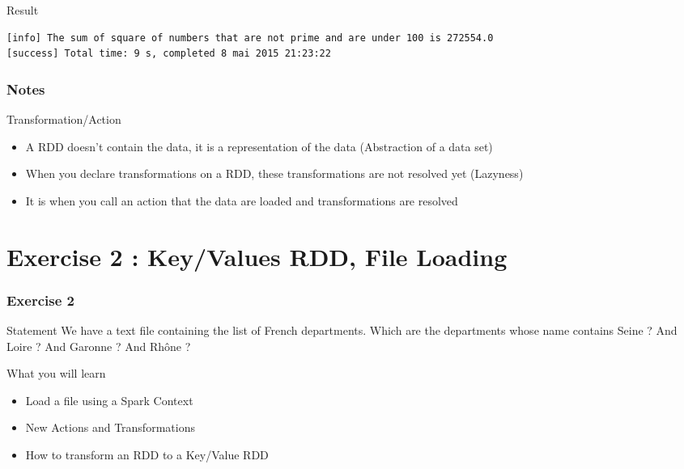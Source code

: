 \documentclass[slidetop,9pt,utf8]{beamer}
\begin{document}
\begin{CJK}{UTF8}{gbsn}
\begin{frame}[fragile]
  \begin{block}{Result}
    \begin{lstlisting}[language=bash, style=terminal]
[info] The sum of square of numbers that are not prime and are under 100 is 272554.0
[success] Total time: 9 s, completed 8 mai 2015 21:23:22
    \end{lstlisting}
  \end{block}

\end{frame}

\begin{frame}
  \frametitle{Notes}

  \begin{exampleblock}{Transformation/Action}
    \begin{itemize}
      \item A RDD doesn't contain the data, it is a representation of the data (Abstraction of a data set)
      \item When you declare transformations on a RDD, these transformations are not resolved yet (Lazyness)
      \item It is when you call an action that the data are loaded and transformations are resolved
    \end{itemize}
  \end{exampleblock}

\end{frame}

%
%
%
%

\section{Exercise 2 : Key/Values RDD, File Loading}


\begin{frame}
  \frametitle{Exercise 2}

  \begin{block}{Statement}
    We have a text file containing the list of French departments. Which are the departments whose name contains Seine ? And Loire ? And Garonne ? And Rhône ?
  \end{block}

  \begin{block}{What you will learn}
    \begin{itemize}
      \item Load a file using a Spark Context
      \item New Actions and Transformations
      \item How to transform an RDD to a Key/Value RDD
    \end{itemize}
  \end{block}


\end{frame}
\end{CJK}
\end{document}
